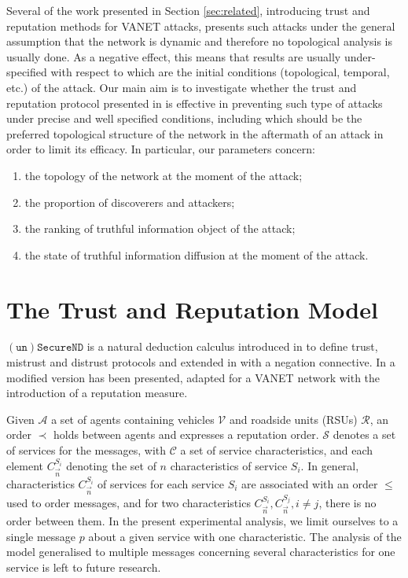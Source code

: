 \documentclass[compsoc, conference, letterpaper, 10pt, times]{IEEEtran}
\begin{document}
Several of the work presented in Section \ref{sec:related}, introducing trust and reputation methods for VANET attacks, presents such attacks under the general assumption that the network is dynamic and therefore no topological analysis is usually done. As a negative effect, this means that results are usually under-specified with respect to which are the initial conditions (topological, temporal, etc.) of the attack. Our main aim is to investigate whether the trust and reputation protocol presented in \cite{DBLP:conf/eurosp/PrimieroRCN17} is effective in preventing such type of attacks under precise and well specified conditions, including which should be the preferred topological structure of the network in the aftermath of an attack in order to limit its efficacy. In particular, our parameters concern:
\begin{enumerate}
\item the topology of the network at the moment of the attack;
\item the proportion of discoverers and attackers;
\item the ranking of truthful information object of the attack;
\item the state of truthful information diffusion at the moment of the attack.
\end{enumerate}

\section{The Trust and Reputation Model}\label{sec:model}

$\mathtt{(un)SecureND}$ is a natural deduction calculus introduced in \cite{DBLP:conf/pst/PrimieroR14} to define trust, mistrust and distrust protocols and extended in \cite{DBLP:conf/ifiptm/Primiero16} with a negation connective. In \cite{DBLP:conf/eurosp/PrimieroRCN17} a modified version has been presented, adapted for a VANET network with the introduction of a reputation measure.

Given $\mathcal{A}$ a set of agents containing vehicles $\mathcal{V}$ and roadside units (RSUs) $\mathcal{R}$, an order $\prec$ holds between agents and expresses a reputation order. $\mathcal{S}$ denotes a set of services for the messages, with $\mathcal{C}$ a set of service characteristics, and each element $C^{S_i}_{\overrightarrow{n}}$ denoting the set of $n$ characteristics of service $S_{i}$. In general, characteristics $C^{S_i}_{\overrightarrow{n}}$ of services for each service $S_i$ are associated with an order $\leq$ used to order messages, and for two characteristics
$C^{S_{i}}_{\overrightarrow{n}}, C^{S_{j}}_{\overrightarrow{n}}, i\neq j$, there is no order between them. In the present experimental analysis, we limit ourselves to a single message $p$ about a given service with one characteristic. The analysis of the model generalised to multiple messages concerning several characteristics for one service is left to future research.
\end{document}
